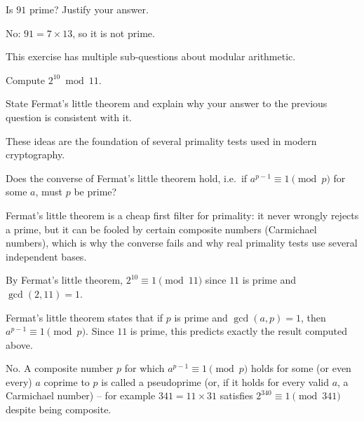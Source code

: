 \documentclass[solutions]{worksheet}
\begin{document}
\begin{exercise}

  Is $91$ prime? Justify your answer.

\end{exercise}

\begin{solution}

  No: $91 = 7 \times 13$, so it is not prime.

\end{solution}

\begin{exercise}

  This exercise has multiple sub-questions about modular arithmetic.

  \begin{questions}

    \question Compute $2^{10} \bmod 11$.

    \question State Fermat's little theorem and explain why your answer to
    the previous question is consistent with it.

  \end{questions}

  These ideas are the foundation of several primality tests used in modern
  cryptography.

  \begin{questions}

    \question Does the converse of Fermat's little theorem hold, i.e.\ if
    $a^{p-1} \equiv 1 \pmod p$ for some $a$, must $p$ be prime?

  \end{questions}

\end{exercise}

\begin{solution}

  Fermat's little theorem is a cheap first filter for primality: it never
  wrongly rejects a prime, but it can be fooled by certain composite
  numbers (Carmichael numbers), which is why the converse fails and why
  real primality tests use several independent bases.

  \begin{answers}

    \answer By Fermat's little theorem, $2^{10} \equiv 1 \pmod{11}$ since
      $11$ is prime and $\gcd(2, 11) = 1$.

    \answer Fermat's little theorem states that if $p$ is prime and
      $\gcd(a, p) = 1$, then $a^{p-1} \equiv 1 \pmod p$. Since $11$ is
      prime, this predicts exactly the result computed above.

    \answer No. A composite number $p$ for which $a^{p-1} \equiv 1
      \pmod p$ holds for some (or even every) $a$ coprime to $p$ is called
      a pseudoprime (or, if it holds for every valid $a$, a Carmichael
      number) -- for example $341 = 11 \times 31$ satisfies
      $2^{340} \equiv 1 \pmod{341}$ despite being composite.

  \end{answers}

\end{solution}
\end{document}
